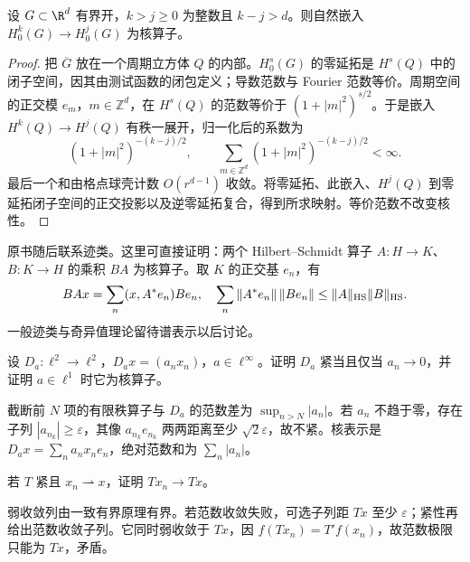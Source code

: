 \begin{proposition}\label{prop:y10-nuclear-sobolev}
设 $G\subset\R^d$ 有界开，$k>j\ge0$ 为整数且 $k-j>d$。则自然嵌入 $H_0^k(G)\to H_0^j(G)$ 为核算子。
\end{proposition}
\begin{proof}
把 $\overline G$ 放在一个周期立方体 $Q$ 的内部。$H_0^s(G)$ 的零延拓是 $H^s(Q)$ 中的闭子空间，因其由测试函数的闭包定义；导数范数与 Fourier 范数等价。周期空间的正交模 $e_m$，$m\in\mathbb Z^d$，在 $H^s(Q)$ 的范数等价于 $(1+|m|^2)^{s/2}$。于是嵌入 $H^k(Q)\to H^j(Q)$ 有秩一展开，归一化后的系数为
\[
 (1+|m|^2)^{-(k-j)/2},\qquad
 \sum_{m\in\mathbb Z^d}(1+|m|^2)^{-(k-j)/2}<\infty.
\]
最后一个和由格点球壳计数 $O(r^{d-1})$ 收敛。将零延拓、此嵌入、$H^j(Q)$ 到零延拓闭子空间的正交投影以及逆零延拓复合，得到所求映射。等价范数不改变核性。
\end{proof}

原书随后联系迹类。这里可直接证明：两个 Hilbert--Schmidt 算子 $A:H\to K$、$B:K\to H$ 的乘积 $BA$ 为核算子。取 $K$ 的正交基 $e_n$，有
\[
 BAx=\sum_n(x,A^*e_n)Be_n,\quad
 \sum_n\|A^*e_n\|\,\|Be_n\|\le\|A\|_{\rm HS}\|B\|_{\rm HS}.
\]
一般迹类与奇异值理论留待谱表示以后讨论。

\begin{exercise}[对角紧算子]\label{ex:y10-diagonal}
设 $D_a:\ell^2\to\ell^2$，$D_ax=(a_nx_n)$，$a\in\ell^\infty$。证明 $D_a$ 紧当且仅当 $a_n\to0$，并证明 $a\in\ell^1$ 时它为核算子。
\end{exercise}
\begin{solution}
截断前 $N$ 项的有限秩算子与 $D_a$ 的范数差为 $\sup_{n>N}|a_n|$。若 $a_n$ 不趋于零，存在子列 $|a_{n_k}|\ge\varepsilon$，其像 $a_{n_k}e_{n_k}$ 两两距离至少 $\sqrt2\varepsilon$，故不紧。核表示是 $D_ax=\sum_n a_nx_ne_n$，绝对范数和为 $\sum_n|a_n|$。
\end{solution}

\begin{exercise}[紧算子改善弱收敛]\label{ex:y10-weak-strong}
若 $T$ 紧且 $x_n\rightharpoonup x$，证明 $Tx_n\to Tx$。
\end{exercise}
\begin{solution}
弱收敛列由一致有界原理有界。若范数收敛失败，可选子列距 $Tx$ 至少 $\varepsilon$；紧性再给出范数收敛子列。它同时弱收敛于 $Tx$，因 $f(Tx_n)=T'f(x_n)$，故范数极限只能为 $Tx$，矛盾。
\end{solution}
